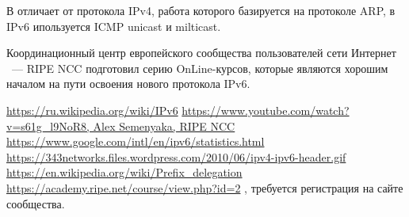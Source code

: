 \documentclass[10pt, a5paper]{article}
\begin{document}
В отличает от протокола IPv4, работа которого базируется на протоколе ARP, в IPv6 ипользуется ICMP unicast и milticast.

Координационный центр европейского сообщества пользователей сети Интернет ~--- RIPE NCC подготовил серию OnLine-курсов, которые являются хорошим началом на пути освоения нового протокола IPv6. ~\cite{Semernik-5}
\begin{thebibliography}{20}
\url{https://ru.wikipedia.org/wiki/IPv6}
\url{https://www.youtube.com/watch?v=s61g\_l9NoR8, Alex Semenyaka, RIPE NCC}
\url{https://www.google.com/intl/en/ipv6/statistics.html}
\url{https://343networks.files.wordpress.com/2010/06/ipv4-ipv6-header.gif}
\url{https://en.wikipedia.org/wiki/Prefix\_delegation}
\url{https://academy.ripe.net/course/view.php?id=2} , требуется регистрация на сайте сообщества.
\end{thebibliography}
\end{document}

